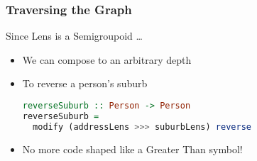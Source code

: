 \begin{frame}[fragile]
\frametitle{Traversing the Graph}

\begin{block}{Since Lens is a Semigroupoid \ldots}
\begin{itemize}
\item We can compose to an arbitrary depth
\item To reverse a person's suburb
\begin{lstlisting}[language=haskell]
reverseSuburb :: Person -> Person
reverseSuburb =
  modify (addressLens >>> suburbLens) reverse
\end{lstlisting}
\item No more code shaped like a Greater Than symbol!

\end{itemize}
\end{block}

\end{frame}

